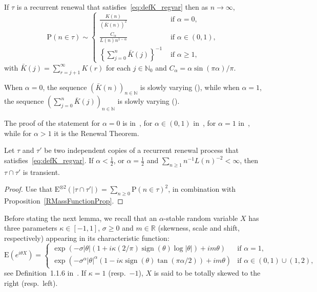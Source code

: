 \documentclass[10pt]{amsart}
\theoremstyle{definition}\newtheorem{defi}[theo]{Definition}\newtheorem{rema}[theo]{Remark}\newtheorem{exam}[theo]{Example}\newtheorem{exem}[theo]{Example}\newtheorem{nota}[theo]{Notation}
\DeclareMathOperator{\sign}{sign}
\newcommand{\bbN}{{\ensuremath{\mathbb N}}}
\newcommand{\bbR}{{\ensuremath{\mathbb R}}}
\newcommand{\ga}{\alpha}
\newcommand\bP{\ensuremath{\mathrm{P}}}
\newcommand\bE{\ensuremath{\mathrm{E}}}
\newcommand*{\MK}{\mkern 2mu}
\begin{document}
\begin{prop}\label{RMassFunctionProp}
If $\tau$ is a recurrent renewal that satisfies~\eqref{eq:defK_regvar} then as $n \to \infty$,
\begin{equation}\label{RMassFunction}
\bP(n \in \tau) \sim
\begin{cases}
\frac{K(n)}{(\bar K(n))^2} & \text{ if } \ga = 0,\\[4pt]
\frac{C_\ga}{L(n) n^{1 - \ga}} & \text{ if } \ga \in (0,1),\\[4pt]
\left\{ \sum_{j=0}^n \bar K(j) \right\}^{-1} & \text{ if } \ga \geq 1,
\end{cases}
\end{equation}
with $\bar K(j) = \sum_{r=j+1}^\infty K(r)$ for each $j\in\bbN_0$ and $C_\ga = \ga \sin(\pi \ga)/\pi$.
\end{prop}

When $\ga = 0$, the sequence $(\bar K(n))_{n\in\bbN}$ is slowly varying (\cite[Propos-\linebreak ition~1.5.9$\MK$(b)]{BGT89}), while when $\ga = 1$, the sequence $(\sum_{j=0}^ n \bar K(j))_{n\in\bbN}$ is slowly varying (\cite[Prop\-os\-itions~1.5.10 and~1.5.9$\MK$(a)]{BGT89}).

The proof of the statement for $\ga = 0$ is in~\cite[Theorem~1.1]{Na2012}, for $\ga \in (0,1)$ in~\cite[Theorem~1.1]{GL63}, for $\ga = 1$ in~\cite[Theorem~8.7.5]{BGT89}, while for $\ga > 1$ it is the Renewal Theorem.

\begin{prop}\label{pr:transient.inter}
Let $\tau$ and $\tau'$ be two independent copies of a recurrent renewal process that satisfies~\eqref{eq:defK_regvar}. If $\ga < \frac{1}{2}$, or $\ga = \frac{1}{2}$ and $\sum_{n\geq1} n^{-1} L(n)^{-2} < \infty$, then $\tau \cap \tau'$ is transient.
\end{prop}

\begin{proof}
Use that $\bE^{\otimes 2}(|\tau \cap \tau'|) = \sum_{n\geq0} \bP(n \in \tau)^2$, in combination with Prop\-os\-ition~\ref{RMassFunctionProp}.
\end{proof}

Before stating the next lemma, we recall that an $\ga$-stable random variable $X$ has three parameters $\kappa\in[-1,1]$, $\sigma\ge 0$ and $m\in \bbR$ (skewness, scale and shift, respectively) appearing in its characteristic function:
\begin{equation} \label{eq:stable.cf}
\bE(e^{i\theta X}) =
\begin{cases}
\exp(-\sigma |\theta| (1 + i\kappa (2/\pi) \sign(\theta) \log|\theta|) + im\theta) & \text{if }\ga = 1,\\[4pt]
\exp(-\sigma^\ga |\theta|^\ga (1 - i\kappa \sign(\theta) \tan(\pi \ga /2)) + im\theta) & \text{if } \ga\in(0, 1)\cup(1,2),
\end{cases}
\end{equation} see Definition~1.1.6 in~\cite{ST94}. If $\kappa =1$ (resp.\ $-1$), $X$ is said to be totally skewed to the right (resp.\ left).
\end{document}
